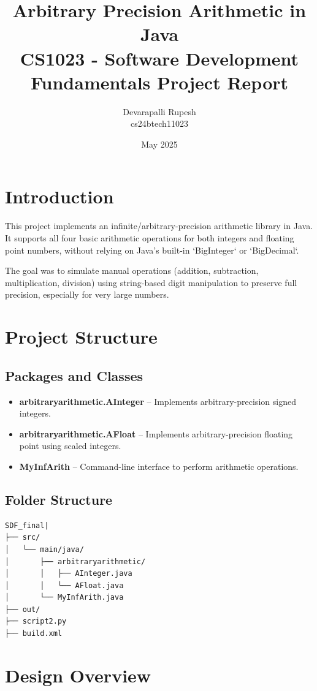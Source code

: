 \documentclass[11pt,a4paper]{article}
\title{\textbf{Arbitrary Precision Arithmetic in Java}\\
\large CS1023 - Software Development Fundamentals Project Report}
\author{Devarapalli Rupesh \\ cs24btech11023}
\date{May 2025}
\begin{document}
\maketitle
\tableofcontents
\newpage

\section{Introduction}
This project implements an infinite/arbitrary-precision arithmetic library in Java. It supports all four basic arithmetic operations for both integers and floating point numbers, without relying on Java's built-in `BigInteger` or `BigDecimal`.

The goal was to simulate manual operations (addition, subtraction, multiplication, division) using string-based digit manipulation to preserve full precision, especially for very large numbers.

\section{Project Structure}

\subsection{Packages and Classes}
\begin{itemize}
    \item \textbf{arbitraryarithmetic.AInteger} -- Implements arbitrary-precision signed integers.
    \item \textbf{arbitraryarithmetic.AFloat} -- Implements arbitrary-precision floating point using scaled integers.
    \item \textbf{MyInfArith} -- Command-line interface to perform arithmetic operations.
\end{itemize}

\subsection{Folder Structure}
\begin{verbatim}
SDF_final|
├── src/
│   └── main/java/
│       ├── arbitraryarithmetic/
│       │   ├── AInteger.java
│       │   └── AFloat.java
│       └── MyInfArith.java
├── out/
├── script2.py
├── build.xml
\end{verbatim}

\section{Design Overview}
\end{document}
